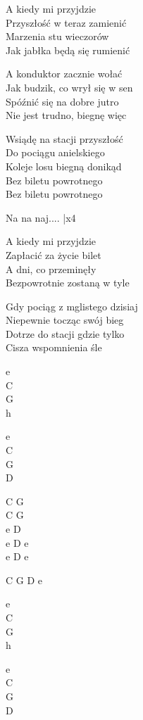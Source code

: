 \begin{text}
    A kiedy mi przyjdzie\\
    Przyszłość w teraz zamienić\\
    Marzenia stu wieczorów\\
    Jak jabłka będą się rumienić

    A konduktor zacznie wołać\\
    Jak budzik, co wrył się w sen\\
    Spóźnić się na dobre jutro\\
    Nie jest trudno, biegnę więc	

    \vin Wsiądę na stacji przyszłość\\
    \vin Do pociągu anielskiego\\
    \vin Koleje losu biegną donikąd\\
    \vin Bez biletu powrotnego\\
    \vin Bez biletu powrotnego	

    \vin Na na naj.... |x4	

    A kiedy mi przyjdzie\\
    Zapłacić za życie bilet\\
    A dni, co przeminęły\\
    Bezpowrotnie zostaną w tyle

    Gdy pociąg z mglistego dzisiaj\\
    Niepewnie tocząc swój bieg\\
    Dotrze do stacji gdzie tylko\\
    Cisza wspomnienia śle
\end{text}
\begin{chord}
    e\\
    C\\
    G\\
    h

    e\\
    C\\
    G\\
    D

    C G\\
    C G\\
    e D\\
    e D e\\
    e D e

    C G D e

    e\\
    C\\
    G\\
    h

    e\\
    C\\
    G\\
    D
\end{chord}